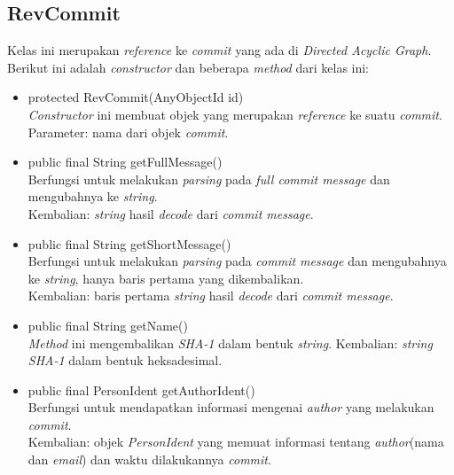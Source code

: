 \subsection{RevCommit}
\label{subsec:revcommit}
Kelas ini merupakan \textit{reference} ke \textit{commit} yang ada di \textit{Directed Acyclic Graph}. Berikut ini adalah \textit{constructor} dan beberapa \textit{method} dari kelas ini:
\begin{itemize}
\item protected RevCommit(AnyObjectId id)\\
\textit{Constructor} ini membuat objek yang merupakan \textit{reference} ke suatu \textit{commit}.\\
Parameter: nama dari objek \textit{commit}.  

\item public final String getFullMessage()\\
Berfungsi untuk melakukan \textit{parsing} pada \textit{full commit message} dan mengubahnya ke \textit{string}.\\
Kembalian: \textit{string} hasil \textit{decode} dari \textit{commit message}.

\item public final String getShortMessage()\\
Berfungsi untuk melakukan \textit{parsing} pada \textit{commit message} dan mengubahnya ke \textit{string}, hanya baris pertama yang dikembalikan.\\
Kembalian: baris pertama \textit{string} hasil \textit{decode} dari \textit{commit message}.

\item public final String getName()\\
\textit{Method} ini mengembalikan \textit{SHA-1} dalam bentuk \textit{string}.
Kembalian: \textit{string SHA-1} dalam bentuk heksadesimal. 

\item public final PersonIdent getAuthorIdent()\\
Berfungsi untuk mendapatkan informasi mengenai \textit{author} yang melakukan \textit{commit}.\\
Kembalian: objek \textit{PersonIdent} yang memuat informasi tentang \textit{author}(nama dan \textit{email}) dan waktu dilakukannya \textit{commit}.
\end{itemize}

